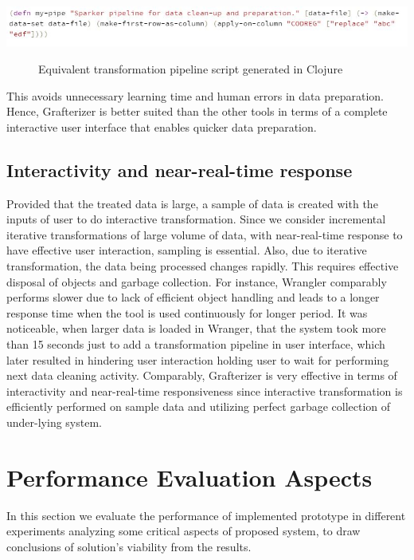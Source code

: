 \begin{center}
	\includegraphics[width=38em]{./Figures/code-generated}
	\begin{figure}[htbp]
    \caption{Equivalent transformation pipeline script generated in Clojure}
    \label{fig:codegenerated}
	\end{figure}
\end{center}
This avoids unnecessary learning time and human errors in data preparation. Hence, Grafterizer is better suited than the other tools in terms of a complete interactive user interface that enables quicker data preparation.
\subsection{Interactivity and near-real-time response}
Provided that the treated data is large, a sample of data is created with the inputs of user to do interactive transformation. Since we consider incremental iterative transformations of large volume of data, with near-real-time response to have effective user interaction, sampling is essential.  Also, due to iterative transformation, the data being processed changes rapidly. This requires effective disposal of objects and garbage collection. For instance, Wrangler comparably performs slower due to lack of efficient object handling and leads to a longer response time when the tool is used continuously for longer period. It was noticeable, when larger data is loaded in Wranger\cite{2011-wrangler}, that the system took more than 15 seconds just to add a transformation pipeline in user interface, which later resulted in hindering user interaction holding user to wait for performing next data cleaning activity. Comparably, Grafterizer is very effective in terms of interactivity and near-real-time responsiveness since interactive transformation is efficiently performed on sample data and utilizing perfect garbage collection of under-lying system.
\section{Performance Evaluation Aspects}
In this section we evaluate the performance of implemented prototype in different experiments analyzing some critical aspects of proposed system, to draw conclusions of solution's viability from the results.
